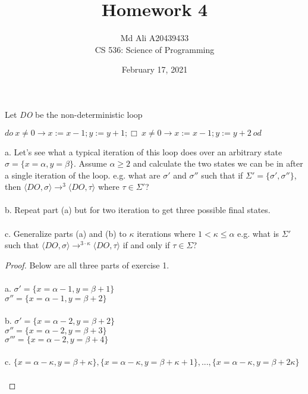 \documentclass[12pt]{article}
\newenvironment{exercise}[2][Exercise]{\begin{trivlist}
\item[\hskip \labelsep {\bfseries #1}\hskip \labelsep {\bfseries #2.}]}{\end{trivlist}}
\begin{document}
 
\title{Homework 4}
\author{Md Ali A20439433 \\ 
CS 536: Science of Programming} 
\date{February 17, 2021}

\maketitle
 
\begin{exercise}{1}
Let \textit{DO} be the non-deterministic loop \\ 
\begin{center}
    $do\: x \neq 0 \rightarrow x := x - 1; y := y + 1; \Box\: x \neq 0 \rightarrow x := x - 1; y := y +2\: od$
\end{center} 
a. Let's see what a typical iteration of this loop does over an arbitrary state $\sigma = \{x = \alpha, y = \beta \}$. Assume $\alpha \geq 2$ and calculate the two states we can be in after a single iteration of the loop. e.g. what are $\sigma'$ and $\sigma''$ such that if $\Sigma' = \{\sigma', \sigma''\}$, then $\langle DO, \sigma \rangle \rightarrow^{3} \langle DO, \tau \rangle$ where $\tau \in \Sigma'$? \\ \\
b. Repeat part (a) but for two iteration to get three possible final states. \\ \\
c. Generalize parts (a) and (b) to $\kappa$ iterations where $1 < \kappa \leq \alpha$ e.g. what is $\Sigma'$ such that $\langle DO, \sigma \rangle \rightarrow^{3 \cdot \kappa} \langle DO, \tau \rangle$ if and only if $\tau \in \Sigma$?
\end{exercise} 

\begin{proof}
Below are all three parts of exercise 1. \\ \\ 
a. $\sigma' = \{x = \alpha - 1, y = \beta + 1\}$ \\
$\sigma'' = \{x = \alpha - 1, y = \beta + 2\}$ \\ \\ 
b. $\sigma' = \{x = \alpha - 2, y = \beta + 2\}$ \\ 
$\sigma'' = \{x = \alpha - 2, y = \beta + 3 \}$ \\ 
$\sigma''' = \{x = \alpha - 2, y = \beta + 4 \}$ \\ \\ 
c. $\{x = \alpha - \kappa, y = \beta + \kappa\},\{x = \alpha - \kappa, y = \beta + \kappa + 1\},...,\{x = \alpha - \kappa, y = \beta + 2 \kappa\}$ \\ \\ 
\end{proof}
\end{document}
